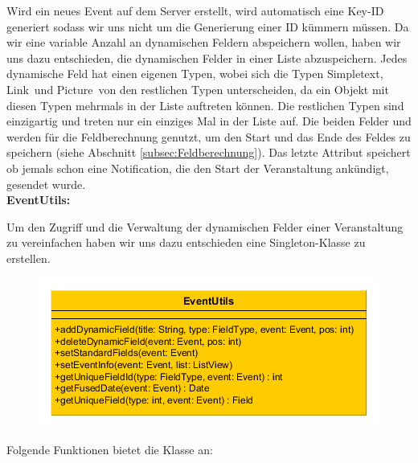 Wird ein neues Event auf dem Server erstellt, wird automatisch eine Key-ID generiert sodass wir uns nicht um die Generierung einer ID kümmern müssen. Da wir eine variable Anzahl an dynamischen Feldern abspeichern wollen, haben wir uns dazu entschieden, die dynamischen Felder in einer Liste abzuspeichern. Jedes dynamische Feld hat einen eigenen Typen, wobei sich die Typen \glqq Simpletext\grqq, \glqq Link\grqq\ und \glqq Picture\grqq\ von den restlichen Typen unterscheiden, da ein Objekt mit diesen Typen mehrmals in der Liste auftreten können. Die restlichen Typen sind einzigartig und treten nur ein einziges Mal in der Liste auf. Die beiden Felder  und  werden für die Feldberechnung genutzt, um den Start und  das Ende des Feldes zu speichern
(siehe Abschnitt \ref{subsec:Feldberechnung}). Das letzte Attribut  speichert ob jemals schon eine Notification, die den Start der Veranstaltung ankündigt, gesendet wurde.\\

\textbf{EventUtils:}

Um den Zugriff und die Verwaltung der dynamischen Felder einer Veranstaltung zu vereinfachen haben wir uns dazu entschieden eine Singleton-Klasse  zu erstellen.

\begin{figure}[htb]
\centering
\includegraphics[width=\textwidth]{graphics/EventUtils_long.png}
\label{fig:eventutils}
\end{figure}

Folgende Funktionen bietet die Klasse  an:

